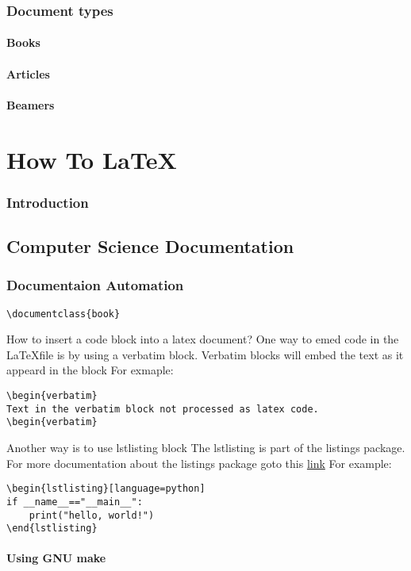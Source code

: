 \documentclass[12pt]{book}
\begin{document}
\section{Document types}
\subsection{Books}
\subsection{Articles}
\subsection{Beamers}


\part{How To \LaTeX}
\section{Introduction}
\chapter{Computer Science Documentation}
\section{Documentaion Automation}
\begin{verbatim}
\documentclass{book}
\end{verbatim}

\newpage
How to insert a code block into a latex document?
\newline One way to emed code in the \LaTeX  file is by using a verbatim 
block. Verbatim blocks will embed the text as it 
appeard in the block
\newline For exmaple:
\begin{verbatim}
\begin{verbatim}
Text in the verbatim block not processed as latex code.
\begin{verbatim}
\end{verbatim}
Another way is to use lstlisting block
The lstlisting is part of the listings package.
For more documentation about the listings package goto this \href{https://ctan.math.illinois.edu/macros/latex/contrib/listings/listings.pdf}{link}
\newline For example:
\begin{verbatim}
\begin{lstlisting}[language=python]
if __name__=="__main__":
    print("hello, world!")
\end{lstlisting}
\end{verbatim}
\subsection{Using GNU make}
\end{document}
